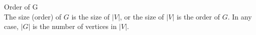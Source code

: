 \begin{defn}{Order of G} \\
The size (order) of $G$ is the size of $|V|$, or the size of $|V|$ is the order of $G$. In any case, $|G|$ is the number of vertices in $|V|$. 
\end{defn}
